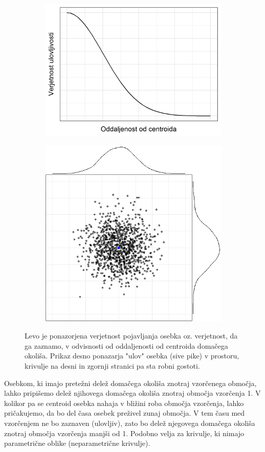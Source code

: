 \begin{figure}
\centering
\begin{subfigure}{0.5\textwidth}
  \centering
  \includegraphics[width=0.5\linewidth]{../r_koda_slike/figures/half_normal.png}
  \label{sli:sub2.1}
\end{subfigure}%
\begin{subfigure}{0.5\textwidth}
  \centering
  \includegraphics[width=0.5\linewidth]{../r_koda_slike/figures/homerange_usage.png}
  \label{sli:sub2.2}
\end{subfigure}
\caption[Funkcija simuliranja vzorčnih točk]{Levo je ponazorjena verjetnost pojavljanja osebka oz. verjetnost, da ga zaznamo, v odvisnosti od oddaljenosti od centroida domačega okoliša. Prikaz desno ponazarja "ulov" osebka (sive pike) v prostoru, krivulje na desni in zgornji stranici pa sta robni gostoti.}
\label{sli:slika2}
\end{figure}

Osebkom, ki imajo pretežni delež domačega okoliša znotraj vzorčenega območja, lahko pripišemo delež njihovega domačega okoliša znotraj območja vzorčenja 1. V kolikor pa se centroid osebka nahaja v bližini roba območja vzorčenja, lahko pričakujemo, da bo del časa osebek preživel zunaj območja. V tem času med vzorčenjem ne bo zaznaven (ulovljiv), zato bo delež njegovega domačega okoliša znotraj območja vzorčenja manjši od 1. Podobno velja za krivulje, ki nimajo parametrične oblike (neparametrične krivulje).

